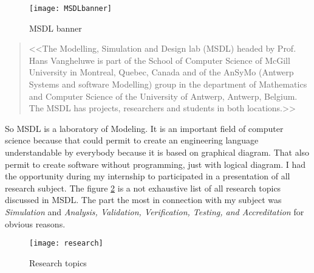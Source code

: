 \begin{figure}[!h]
  \centering
  \texttt{[image: MSDLbanner]}
  \caption{MSDL banner}
  \label{fig:msdl}
\end{figure}


\begin{quotation}
<<The Modelling, Simulation and Design lab (MSDL) headed by Prof. Hans Vangheluwe is part of the School of Computer Science of McGill University in Montreal, Quebec, Canada and of the AnSyMo (Antwerp Systems and software Modelling) group in the department of Mathematics and Computer Science of the University of Antwerp, Antwerp, Belgium. The MSDL has projects, researchers and students in both locations.>>\cite{msdl}
\end{quotation}


So MSDL is a laboratory of Modeling. It is an important field of computer science because that could permit to create an engineering language understandable by everybody because it is based on graphical diagram. That also permit to create software without programming, just with logical diagram. I had the opportunity during my internship to participated in a presentation of all research subject. The figure \ref{fig:subject} is a not exhaustive list of all research topics discussed in MSDL. The part the most in connection with my subject was \textit{Simulation} and \textit{Analysis, Validation, Verification, Testing, and Accreditation} for obvious reasons.


\begin{figure}[h]
  \centering
  \texttt{[image: research]}
  \caption{Research topics}
  \label{fig:subject}
\end{figure}



